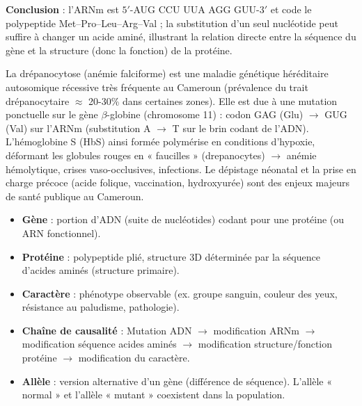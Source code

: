 \documentclass[11pt]{article}
\begin{document}
\begin{exoresolu}
\begin{enumerate}
\end{enumerate}
\textbf{Conclusion} : l'ARNm est $5'$-AUG CCU UUA AGG GUU-$3'$ et code le polypeptide Met--Pro--Leu--Arg--Val ; la substitution d'un seul nucléotide peut suffire à changer un acide aminé, illustrant la relation directe entre la séquence du gène et la structure (donc la fonction) de la protéine.
\end{exoresolu}

\begin{savaistu}
La drépanocytose (anémie falciforme) est une maladie génétique héréditaire autosomique récessive très fréquente au Cameroun (prévalence du trait drépanocytaire $\approx$ 20-30\% dans certaines zones). Elle est due à une mutation ponctuelle sur le gène $\beta$-globine (chromosome 11) : codon GAG (Glu) $\rightarrow$ GUG (Val) sur l'ARNm (substitution A $\rightarrow$ T sur le brin codant de l'ADN). L'hémoglobine S (HbS) ainsi formée polymérise en conditions d'hypoxie, déformant les globules rouges en « faucilles » (drepanocytes) $\rightarrow$ anémie hémolytique, crises vaso-occlusives, infections. Le dépistage néonatal et la prise en charge précoce (acide folique, vaccination, hydroxyurée) sont des enjeux majeurs de santé publique au Cameroun.
\end{savaistu}

\begin{aretenir}
\begin{itemize}
\item \textbf{Gène} : portion d'ADN (suite de nucléotides) codant pour une protéine (ou ARN fonctionnel).
\item \textbf{Protéine} : polypeptide plié, structure 3D déterminée par la séquence d'acides aminés (structure primaire).
\item \textbf{Caractère} : phénotype observable (ex. groupe sanguin, couleur des yeux, résistance au paludisme, pathologie).
\item \textbf{Chaîne de causalité} : Mutation ADN $\rightarrow$ modification ARNm $\rightarrow$ modification séquence acides aminés $\rightarrow$ modification structure/fonction protéine $\rightarrow$ modification du caractère.
\item \textbf{Allèle} : version alternative d'un gène (différence de séquence). L'allèle « normal » et l'allèle « mutant » coexistent dans la population.
\end{itemize}
\end{aretenir}
\end{document}
